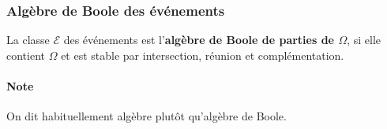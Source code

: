 \documentclass[10pt, french]{article}
\begin{document}
\begin{multicols*}{2}
\subsubsection{Algèbre de Boole des événements}
\begin{definitionNOHFILL}
La classe $\mathcal{E}$ des événements est l'\textbf{algèbre de Boole de parties de $\Omega$}, si elle contient $\Omega$ et est stable par intersection, réunion et complémentation.

\bigskip

\paragraph{Note}	On dit habituellement algèbre plutôt qu'algèbre de Boole.
\end{definitionNOHFILL}



\end{multicols*}
\end{document}
